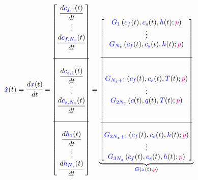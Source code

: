 \documentclass[../Article_Model_Parameters.tex]{subfiles}
\begin{document}
			{\footnotesize
				\begin{align*} \label{discretization}
					\dot{{\color{blue}x}}(t) &= \cfrac{d {\color{blue}x}(t)}{d t} = 
					\begin{bmatrix}
						\cfrac{d {\color{blue}c_{f,1}}(t)}{d t} 	  \\
						\vdots					  \\
						\cfrac{d {\color{blue}c_{f,N_z}}(t)}{d t} \\
						\\ \hline \\
						\cfrac{d {\color{blue}c_{s,1}}(t)}{d t} 	  \\
						\vdots					  \\
						\cfrac{d {\color{blue}c_{s,N_z}}(t)}{d t} \\
						\\ \hline \\
						\cfrac{d {\color{blue}h_1}(t)}{d t} 	  \\
						\vdots 					  \\
						\cfrac{d {\color{blue}h_{N_z}}(t)}{d t}
					\end{bmatrix}
					=
					\underbrace{\begin{bmatrix}
							{\color{blue}G_1} \left( {\color{blue}c_f}(t),{\color{blue}c_s}(t),{\color{blue}h}(t); {\color{magenta}p} \right)\\ 
							\vdots\\ 
							{\color{blue}G_{N_z}} \left( {\color{blue}c_f}(t),{\color{blue}c_s}(t),{\color{blue}h}(t); {\color{magenta}p} \right)\\ 
							\\ \hline \\ \\
							{\color{blue}G_{N_z+1}} \left( {\color{blue}c_f}(t),{\color{blue}c_s}(t),{\color{blue}T}(t); {\color{magenta}p} \right)\\ 
							\vdots\\
							{\color{blue}G_{2N_z}} \left( {\color{blue}c}(t),{\color{blue}q}(t),{\color{blue}T}(t); {\color{magenta}p} \right)\\ 
							\\ \\ \hline \\ 
							{\color{blue}G_{2N_z+1}} \left( {\color{blue}c_f}(t),{\color{blue}c_s}(t),{\color{blue}h}(t); {\color{magenta}p} \right) \\
							\vdots\\
							{\color{blue}G_{3N_z}} \left( {\color{blue}c_f}(t),{\color{blue}c_s}(t),{\color{blue}h}(t); {\color{magenta}p} \right)
					\end{bmatrix}}_{{\color{blue}G} \left( {\color{blue}x}(t); {\color{magenta}p} \right)} 
			\end{align*} }
			
\end{document}
